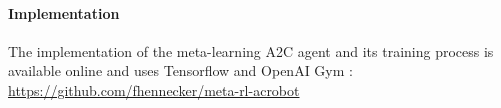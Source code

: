 \documentclass[letterpaper]{article}
\begin{document}
\paragraph{Implementation} The implementation of the meta-learning A2C agent
and its training process is available online and uses 
Tensorflow \citep{tensorflow} and OpenAI Gym \citep{gym}:\\
\url{https://github.com/fhennecker/meta-rl-acrobot}
\footnotesize


\end{document}
